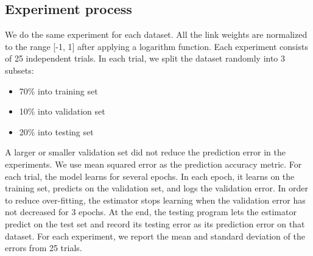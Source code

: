 \documentclass[12pt]{WSUThesis}
\theoremstyle{definition}
\begin{document}
\subsection{Experiment process}
We do the same experiment for each dataset.
All the link weights are normalized to the range [-1, 1] after applying a logarithm function.
Each experiment consists of 25 independent trials.
In each trial, we split the dataset randomly into 3 subsets:
\begin{itemize}
	\item 70\% into training set
	\item 10\% into validation set
	\item 20\% into testing set
\end{itemize}
A larger or smaller validation set did not reduce the prediction error in the 
experiments.
We use mean squared error as the prediction accuracy metric.
For each trial, the model learns for several epochs.
In each epoch,
it learns on the training set,
predicts on the validation set,
and logs the validation error.
In order to reduce over-fitting,
the estimator stops learning when the validation error has not decreased for 3 
epochs.
At the end, the testing program lets the estimator predict on the test set 
and record its testing error as its prediction error on that dataset.
For each experiment, we report the mean and standard deviation of the errors from 25 trials.
\end{document}
